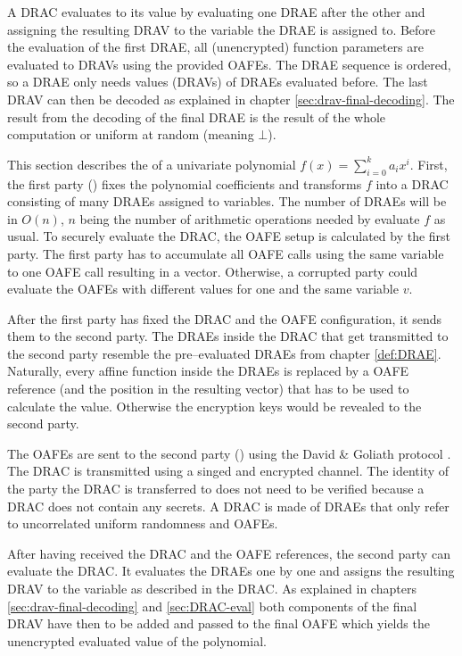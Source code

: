 \label{sec:DRAC-eval}

A DRAC evaluates to its value by evaluating one DRAE after the other and
assigning the resulting DRAV to the variable the DRAE is assigned to. Before the
evaluation of the first DRAE, all (unencrypted) function parameters are
evaluated to DRAVs using the provided OAFEs. The DRAE sequence is ordered, so a
DRAE only needs values (DRAVs) of DRAEs evaluated before. The last DRAV can then
be decoded as explained in chapter \ref{sec:drav-final-decoding}. The result
from the decoding of the final DRAE is the result of the whole computation or
uniform at random (meaning $\bot$).


%
%
\label{sec:OPE}

This section describes the  of a
univariate polynomial $f(x) = \sum_{i=0}^k a_ix^i$. First, the first party
(\JWpOne{}) fixes the polynomial coefficients and transforms $f$ into a DRAC
consisting of many DRAEs assigned to variables. The number of DRAEs will be in
$O(n)$, $n$ being the number of arithmetic operations needed by evaluate $f$ as
usual. To securely evaluate the DRAC, the OAFE setup is calculated by the first
party. The first party has to accumulate all OAFE calls using the same variable
to one OAFE call resulting in a vector. Otherwise, a corrupted party could
evaluate the OAFEs with different values for one and the same variable $v$.

After the first party has fixed the DRAC and the OAFE configuration, it sends
them to the second party. The DRAEs inside the DRAC that get transmitted to the
second party resemble the pre--evaluated DRAEs from chapter \ref{def:DRAE}.
Naturally, every affine function inside the DRAEs is replaced by a OAFE
reference (and the position in the resulting vector) that has to be used to
calculate the value. Otherwise the encryption keys would be revealed to the
second party.

The OAFEs are sent to the second party (\JWpTwo{}) using the David \& Goliath
protocol \cite{davidgoliath}. The DRAC is transmitted using a singed and
encrypted channel. The identity of the party the DRAC is transferred to does not
need to be verified because a DRAC does not contain any secrets. A DRAC is made
of DRAEs that only refer to uncorrelated uniform randomness and OAFEs.

After having received the DRAC and the OAFE references, the second party can
evaluate the DRAC\@. It evaluates the DRAEs one by one and assigns the resulting
DRAV to the variable as described in the DRAC\@. As explained in chapters
\ref{sec:drav-final-decoding} and \ref{sec:DRAC-eval} both components of the
final DRAV have then to be added and passed to the final OAFE which yields the
unencrypted evaluated value of the polynomial.


